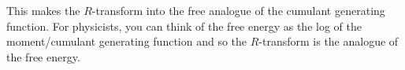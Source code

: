 \documentclass[11pt]{article}
\newtheorem{theorem}{Theorem}
\theoremstyle{definition}
\begin{document}
This makes the $R$-transform into the free analogue of the cumulant generating function. 
For physicists, you can think of the free energy as the log of the moment/cumulant generating function and so the $R$-transform is the analogue of the free energy. 

\end{document}
